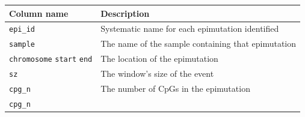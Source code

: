 \documentclass[
]{article}
\begin{document}
\begin{longtable}[]{@{}ll@{}}
\toprule
\begin{minipage}[b]{0.16\columnwidth}\raggedright
Column name\strut
\end{minipage} & \begin{minipage}[b]{0.78\columnwidth}\raggedright
Description\strut
\end{minipage}\tabularnewline
\midrule
\endhead
\begin{minipage}[t]{0.16\columnwidth}\raggedright
\texttt{epi\_id}\strut
\end{minipage} & \begin{minipage}[t]{0.78\columnwidth}\raggedright
Systematic name for each epimutation identified\strut
\end{minipage}\tabularnewline
\begin{minipage}[t]{0.16\columnwidth}\raggedright
\texttt{sample}\strut
\end{minipage} & \begin{minipage}[t]{0.78\columnwidth}\raggedright
The name of the sample containing that epimutation\strut
\end{minipage}\tabularnewline
\begin{minipage}[t]{0.16\columnwidth}\raggedright
\texttt{chromosome} \texttt{start} \texttt{end}\strut
\end{minipage} & \begin{minipage}[t]{0.78\columnwidth}\raggedright
The location of the epimutation\strut
\end{minipage}\tabularnewline
\begin{minipage}[t]{0.16\columnwidth}\raggedright
\texttt{sz}\strut
\end{minipage} & \begin{minipage}[t]{0.78\columnwidth}\raggedright
The window's size of the event\strut
\end{minipage}\tabularnewline
\begin{minipage}[t]{0.16\columnwidth}\raggedright
\texttt{cpg\_n}\strut
\end{minipage} & \begin{minipage}[t]{0.78\columnwidth}\raggedright
The number of CpGs in the epimutation\strut
\end{minipage}\tabularnewline
\begin{minipage}[t]{0.16\columnwidth}\raggedright
\texttt{cpg\_n}\strut
\end{minipage} & \begin{minipage}[t]{0.78\columnwidth}\raggedright

\end{minipage}
\end{longtable}
\end{document}
